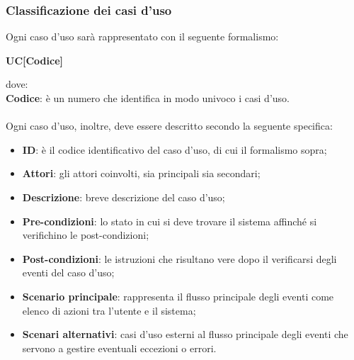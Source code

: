 \subsubsection{Classificazione dei casi d'uso}
Ogni caso d'uso sarà rappresentato con il seguente formalismo:
\begin{center}
    \textbf{UC[Codice]}
\end{center}
dove:\\
\textbf{Codice}: è un numero che identifica in modo univoco i casi d'uso.\\\\
Ogni caso d'uso, inoltre, deve essere descritto secondo la seguente specifica:
\begin{itemize}
    \item
    \textbf{ID}: è il codice identificativo del caso d'uso, di cui il formalismo sopra;
    \item
    \textbf{Attori}: gli attori coinvolti, sia principali sia secondari;
    \item
    \textbf{Descrizione}: breve descrizione del caso d'uso;
    \item
    \textbf{Pre-condizioni}: lo stato in cui si deve trovare il sistema affinché si verifichino le post-condizioni;
    \item
    \textbf{Post-condizioni}: le istruzioni che risultano vere dopo il verificarsi degli eventi del caso d'uso;
    \item
    \textbf{Scenario principale}: rappresenta il flusso principale degli eventi come elenco di azioni tra l'utente e il sistema;
    \item
    \textbf{Scenari alternativi}: casi d'uso esterni al flusso principale degli eventi che servono a gestire eventuali eccezioni o errori.
\end{itemize}
\newpage


